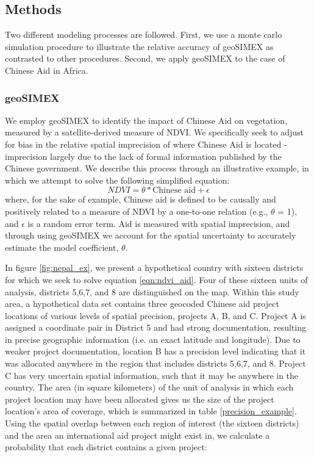 \subsection{Methods}
Two different modeling processes are followed.  First, we use a monte carlo simulation procedure to illustrate the relative accuracy of geoSIMEX as contrasted to other procedures.  Second, we apply geoSIMEX to the case of Chinese Aid in Africa.

\subsubsection{geoSIMEX}
We employ geoSIMEX to identify the impact of Chinese Aid on vegetation, measured by a satellite-derived measure of NDVI.
We specifically seek to adjust for bias in the relative spatial imprecision of where Chinese Aid is located - imprecision largely due to the lack of formal information published by the Chinese government.
We describe this process through an illustrative example, in which we attempt to solve the following simplified equation:
\begin{equation}
NDVI = \theta * \text{Chinese aid} + \epsilon
\label{eqn:ndvi_aid}
\end{equation}
where, for the sake of example, Chinese aid is defined to be causally and positively related to a measure of NDVI by a one-to-one relation (e.g., $\theta$ = 1), and $\epsilon$ is a random error term. 
Aid is measured with spatial imprecision, and through using geoSIMEX we account for the spatial uncertainty to accurately estimate the model coefficient, $\theta$. 
\par
In figure \ref{fig:nepal_ex}, we present a hypothetical country with sixteen districts for which we seek to solve equation \ref{eqn:ndvi_aid}. 
Four of these sixteen units of analysis, districts 5,6,7, and 8 are distinguished on the map. 
Within this study area, a hypothetical data set contains three geocoded Chinese aid project locations of various levels of spatial precision, projects A, B, and C. 
Project A is assigned a coordinate pair in District 5 and had strong documentation, resulting
in precise geographic information (i.e. an exact latitude and longitude). 
Due to weaker project documentation, location B has a precision level indicating that it was allocated anywhere in the region that includes districts 5,6,7, and 8. 
Project C has very uncertain spatial information, such that it may be anywhere in the country. 
The area (in square kilometers) of the unit of analysis in which each project location may have been allocated gives us the size of the project location’s area of coverage, which is summarized in table \ref{precision_example}.
Using the spatial overlap between each region of interest (the sixteen districts) and the area an international aid project might exist in, we calculate a probability that each district contains a given project:

